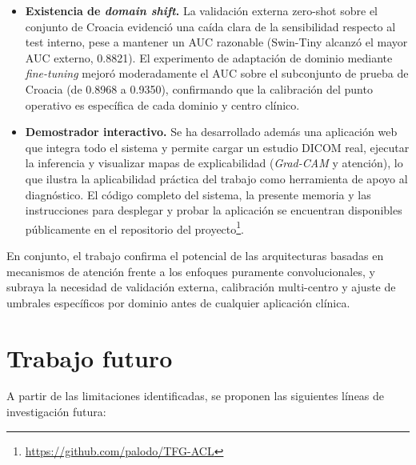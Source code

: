 \begin{itemize}
    \item \textbf{Existencia de \textit{domain shift}.} La validación externa zero-shot sobre el conjunto de Croacia evidenció una caída clara de la sensibilidad respecto al test interno, pese a mantener un AUC razonable (Swin-Tiny alcanzó el mayor AUC externo, 0.8821). El experimento de adaptación de dominio mediante \textit{fine-tuning} mejoró moderadamente el AUC sobre el subconjunto de prueba de Croacia (de 0.8968 a 0.9350), confirmando que la calibración del punto operativo es específica de cada dominio y centro clínico.

    \item \textbf{Demostrador interactivo.} Se ha desarrollado además una aplicación web que integra todo el sistema y permite cargar un estudio DICOM real, ejecutar la inferencia y visualizar mapas de explicabilidad (\textit{Grad-CAM} y atención), lo que ilustra la aplicabilidad práctica del trabajo como herramienta de apoyo al diagnóstico. El código completo del sistema, la presente memoria y las instrucciones para desplegar y probar la aplicación se encuentran disponibles públicamente en el repositorio del proyecto\footnote{\url{https://github.com/palodo/TFG-ACL}}.
\end{itemize}

En conjunto, el trabajo confirma el potencial de las arquitecturas basadas en mecanismos de atención frente a los enfoques puramente convolucionales, y subraya la necesidad de validación externa, calibración multi-centro y ajuste de umbrales específicos por dominio antes de cualquier aplicación clínica.

\section{Trabajo futuro}

A partir de las limitaciones identificadas, se proponen las siguientes líneas de investigación futura:

